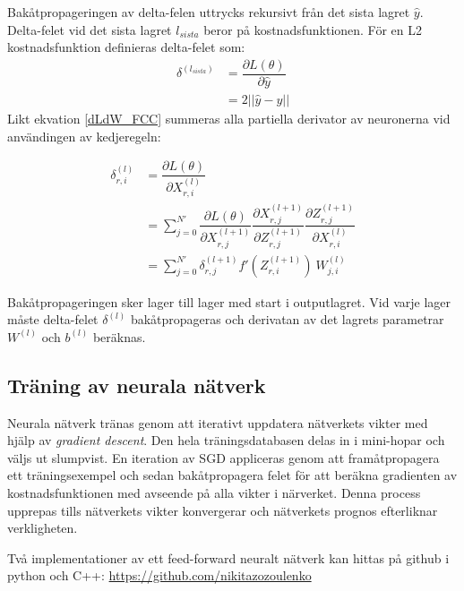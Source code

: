 \documentclass[a4paper,11pt,twoside]{article}
\newcommand*{\pd}[2]{\ensuremath{\dfrac{\partial #1}{\partial #2}}}
\begin{document}
Bakåtpropageringen av delta-felen uttrycks rekursivt från det sista lagret $\hat{y}$. Delta-felet vid det sista lagret $l_{sista}$ beror på kostnadsfunktionen. För en L2 kostnadsfunktion definieras delta-felet som: \cite{cs231n}
\begin{equation}
\begin{split}
\delta^{(l_{sista})}
	& = \pd{L(\theta)}{\hat{y}}  \\
	& = 2 ||\hat{y}-y||
\end{split}
\end{equation}
Likt ekvation \eqref{dLdW_FCC} summeras alla  partiella derivator av neuronerna vid användingen av kedjeregeln: \cite{cs231n}

\begin{equation}\label{dLdX_FCC}
\begin{split}
\delta^{(l)}_{r,i}
	& = \pd{L(\theta)}{X^{(l)}_{r,i}}  \\
	& = \sum^{N'}_{j=0} \pd{L(\theta)}{X^{(l+1)}_{r,j}} \pd{X^{(l+1)}_{r,j}}{Z^{(l+1)}_{r,j}} \pd{Z^{(l+1)}_{r,j}}{X^{(l)}_{r,i}} \\
	& = \sum^{N'}_{j=0} \delta^{(l+1)}_{r,j} f'(Z^{(l+1)}_{r,i}) \ W^{(l)}_{j,i} 
\end{split}
\end{equation}

Bakåtpropageringen sker lager till lager med start i outputlagret. Vid varje lager måste delta-felet $\delta^{(l)}$ bakåtpropageras och derivatan av det lagrets parametrar $W^{(l)}$ och $b^{(l)}$ beräknas. \cite{cs231n}

\subsection{Träning av neurala nätverk}
Neurala nätverk tränas genom att iterativt uppdatera nätverkets vikter med hjälp av \textit{gradient descent}. Den hela träningsdatabasen delas in i mini-hopar och väljs ut slumpvist. En iteration av SGD appliceras genom att framåtpropagera ett träningsexempel och sedan bakåtpropagera felet för att beräkna gradienten av kostnadsfunktionen med avseende på alla vikter i närverket. Denna process upprepas tills nätverkets vikter konvergerar och nätverkets prognos efterliknar verkligheten. \cite{cs231n}

Två implementationer av ett feed-forward neuralt nätverk kan hittas på github i python och C++: \url{https://github.com/nikitazozoulenko}
\end{document}
